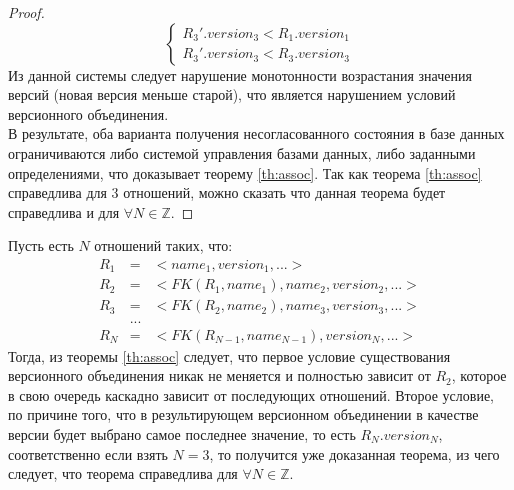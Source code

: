 \begin{proof}
\begin{equation}
\begin{cases}
			R_3'.version_3 < R_1.version_1 \\
			R_3'.version_3 < R_3.version_3
		\end{cases}
	\end{equation} 
	\indent Из данной системы следует нарушение монотонности возрастания значения версий (новая версия меньше старой), что является нарушением условий версионного объединения.\\
	\indent В результате, оба варианта получения несогласованного состояния в базе данных ограничиваются либо системой управления базами данных, либо заданными определениями, что доказывает теорему \ref{th:assoc}.
	\indent Так как теорема \ref{th:assoc} справедлива для 3 отношений, можно сказать что данная теорема будет справедлива и для $\forall N \in \mathbb{Z}$.
\end{proof}

\indent Пусть есть $N$ отношений таких, что:
\begin{eqnarray*}
	R_1 & = & <name_1, version_1, ...> \\
	R_2 & = & <FK(R_1, name_1), name_2, version_2, ...>\\
	R_3 & = & <FK(R_2, name_2), name_3, version_3, ...>\\
	&...&\\
	R_N & = & <FK(R_{N-1}, name_{N-1}), version_N, ...>
\end{eqnarray*}
\indent Тогда, из теоремы \ref{th:assoc} следует, что первое условие существования версионного объединения никак не меняется и полностью зависит от $R_2$, которое в свою очередь каскадно зависит от последующих отношений.
Второе условие, по причине того, что в результирующем версионном объединении в качестве версии будет выбрано самое последнее значение, то есть $R_N.version_N$, соответственно если взять $N = 3$, то получится уже доказанная теорема, из чего следует, что теорема справедлива для $\forall N \in \mathbb{Z}$.





